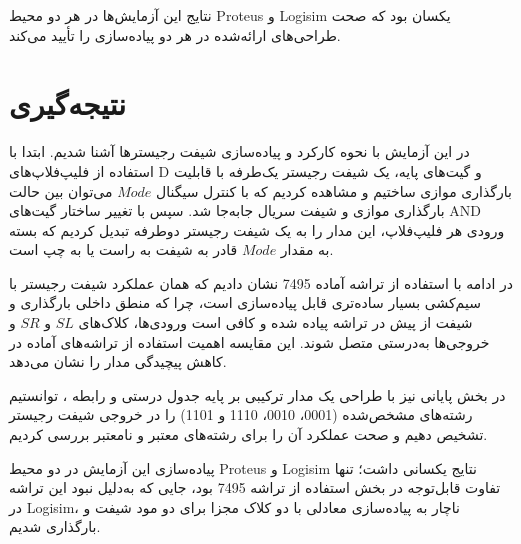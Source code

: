 \documentclass[12pt]{article}
\begin{document}
نتایج این آزمایش‌ها در هر دو محیط Proteus و Logisim یکسان بود که صحت طراحی‌های ارائه‌شده در هر دو پیاده‌سازی را تأیید می‌کند.

\section{نتیجه‌گیری}

در این آزمایش با نحوه کارکرد و پیاده‌سازی شیفت رجیسترها آشنا شدیم. ابتدا با استفاده از فلیپ‌فلاپ‌های D و گیت‌های پایه، یک شیفت رجیستر یک‌طرفه با قابلیت بارگذاری موازی ساختیم و مشاهده کردیم که با کنترل سیگنال $Mode$ می‌توان بین حالت بارگذاری موازی و شیفت سریال جابه‌جا شد. سپس با تغییر ساختار گیت‌های AND ورودی هر فلیپ‌فلاپ، این مدار را به یک شیفت رجیستر دوطرفه تبدیل کردیم که بسته به مقدار $Mode$ قادر به شیفت به راست یا به چپ است.

در ادامه با استفاده از تراشه آماده 7495 نشان دادیم که همان عملکرد شیفت رجیستر با سیم‌کشی بسیار ساده‌تری قابل پیاده‌سازی است، چرا که منطق داخلی بارگذاری و شیفت از پیش در تراشه پیاده شده و کافی است ورودی‌ها، کلاک‌های $SL$ و $SR$ و خروجی‌ها به‌درستی متصل شوند. این مقایسه اهمیت استفاده از تراشه‌های آماده در کاهش پیچیدگی مدار را نشان می‌دهد.

در بخش پایانی نیز با طراحی یک مدار ترکیبی بر پایه جدول درستی و رابطه ، توانستیم رشته‌های مشخص‌شده (0001، 0010، 1110 و 1101) را در خروجی شیفت رجیستر تشخیص دهیم و صحت عملکرد آن را برای رشته‌های معتبر و نامعتبر بررسی کردیم.

پیاده‌سازی این آزمایش در دو محیط Proteus و Logisim نتایج یکسانی داشت؛ تنها تفاوت قابل‌توجه در بخش استفاده از تراشه 7495 بود، جایی که به‌دلیل نبود این تراشه در Logisim، ناچار به پیاده‌سازی معادلی با دو کلاک مجزا برای دو مود شیفت و بارگذاری شدیم.
\end{document}
